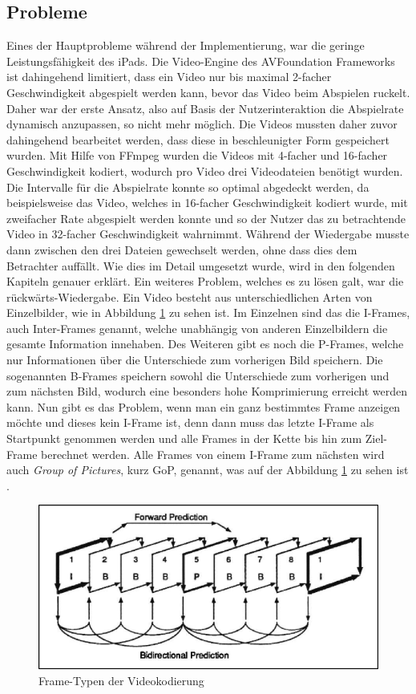 \documentclass[11pt,a4paper]{report}
\begin{document}
\subsection{Probleme}

Eines der Hauptprobleme während der Implementierung, war die geringe Leistungsfähigkeit des iPads. Die Video-Engine des AVFoundation Frameworks ist dahingehend limitiert, dass ein Video nur bis maximal 2-facher Geschwindigkeit abgespielt werden kann, bevor das Video beim Abspielen ruckelt. Daher war der erste Ansatz, also auf Basis der Nutzerinteraktion die Abspielrate dynamisch anzupassen, so nicht mehr möglich. Die Videos mussten daher zuvor dahingehend bearbeitet werden, dass diese in beschleunigter Form gespeichert wurden. Mit Hilfe von FFmpeg wurden die Videos mit 4-facher und 16-facher Geschwindigkeit kodiert, wodurch pro Video drei Videodateien benötigt wurden. Die Intervalle für die Abspielrate konnte so optimal abgedeckt werden, da beispielsweise das Video, welches in 16-facher Geschwindigkeit kodiert wurde, mit zweifacher Rate abgespielt werden konnte und so der Nutzer das zu betrachtende Video in 32-facher Geschwindigkeit wahrnimmt. Während der Wiedergabe musste dann zwischen den drei Dateien gewechselt werden, ohne dass dies dem Betrachter auffällt. Wie dies im Detail umgesetzt wurde, wird in den folgenden Kapiteln genauer erklärt. Ein weiteres Problem, welches es zu lösen galt, war die rückwärts-Wiedergabe. Ein Video besteht aus unterschiedlichen Arten von Einzelbilder, wie in Abbildung \ref{gop_frames} zu sehen ist. Im Einzelnen sind das die I-Frames, auch Inter-Frames genannt, welche unabhängig von anderen Einzelbildern die gesamte Information innehaben. Des Weiteren gibt es noch die P-Frames, welche nur Informationen über die Unterschiede zum vorherigen Bild speichern. Die sogenannten B-Frames speichern sowohl die Unterschiede zum vorherigen und zum nächsten Bild, wodurch eine besonders hohe Komprimierung erreicht werden kann. Nun gibt es das Problem, wenn man ein ganz bestimmtes Frame anzeigen möchte und dieses kein I-Frame ist, denn dann muss das letzte I-Frame als Startpunkt genommen werden und alle Frames in der Kette bis hin zum Ziel-Frame berechnet werden. Alle Frames von einem I-Frame zum nächsten wird auch  \textit{Group of Pictures}, kurz GoP, genannt, was auf der Abbildung \ref{gop_frames} zu sehen ist \cite{wu2005guidelines}.
\begin{figure}[h]
\begin{center}
\includegraphics[scale=1.1]{./images/25.png}
\caption{Frame-Typen der Videokodierung \cite{wu2005guidelines}}
\label{gop_frames}
\end{center}
\end{figure}
\end{document}
